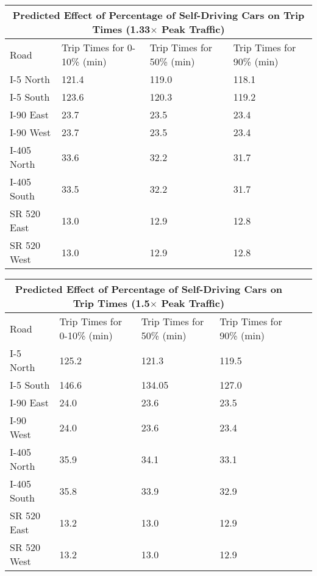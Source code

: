 \noindent \begin{tabular}{
|p{3cm}||p{3cm}|p{3cm}|p{3cm}|
}
 \hline
 \multicolumn{4}{|c|}{Predicted Effect of Percentage of Self-Driving Cars on Trip Times (1.33$\times$ Peak Traffic)} \\
 \hline
 Road & Trip Times for 0-10\% (min) & Trip Times for 50\% (min) & Trip Times for 90\% (min) \\
 \hline
 I-5 North    & 121.4 & 119.0   & 118.1  \\
 I-5 South    & 123.6  & 120.3 & 119.2  \\
 I-90 East    & 23.7 & 23.5  &  23.4 \\
 I-90 West    & 23.7 & 23.5 & 23.4  \\
 I-405 North  & 33.6 & 32.2 & 31.7 \\
 I-405 South  & 33.5 & 32.2 & 31.7 \\
 SR 520 East  & 13.0  & 12.9 & 12.8  \\
 SR 520 West  & 13.0 & 12.9 & 12.8  \\
 \hline
\end{tabular}

\bigskip

\noindent \begin{tabular}{
|p{3cm}||p{3cm}|p{3cm}|p{3cm}|p{3cm}|p{3cm}|
}
 \hline
 \multicolumn{4}{|c|}{Predicted Effect of Percentage of Self-Driving Cars on Trip Times (1.5$\times$ Peak Traffic)} \\
 \hline
 Road & Trip Times for 0-10\% (min) & Trip Times for 50\% (min) & Trip Times for 90\% (min) \\
 \hline
 I-5 North    & 125.2  & 121.3  & 119.5 \\
 I-5 South    & 146.6  & 134.05   & 127.0  \\
 I-90 East    & 24.0 & 23.6 & 23.5  \\
 I-90 West    & 24.0  & 23.6 & 23.4   \\
 I-405 North  & 35.9 & 34.1 & 33.1   \\
 I-405 South  & 35.8  & 33.9 & 32.9   \\
 SR 520 East  & 13.2  & 13.0 & 12.9  \\
 SR 520 West  & 13.2  & 13.0 & 12.9  \\
 \hline
\end{tabular}

\bigskip

